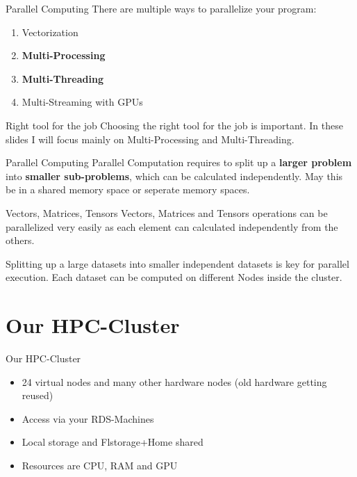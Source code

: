 \documentclass{beamer}
\begin{document}
\begin{frame}{Parallel Computing}
	There are multiple ways to parallelize your program:	
	\begin{enumerate}
		\item Vectorization
		\item \textbf{Multi-Processing}
		\item \textbf{Multi-Threading}
		\item Multi-Streaming with GPUs
	\end{enumerate}
	\begin{block}{Right tool for the job}
			Choosing the right tool for the job is important.  In these slides I will focus mainly on Multi-Processing and Multi-Threading.
	\end{block}

\end{frame}
\begin{frame}{Parallel Computing}
	Parallel Computation requires to split up a \textbf{larger problem} into \textbf{smaller sub-problems}, which can be calculated independently. May this be in a shared memory space or seperate memory spaces.
	
	\begin{block}{Vectors, Matrices, Tensors}
		Vectors, Matrices and Tensors operations can be parallelized very easily as each element can calculated independently from the others.
	\end{block}
	Splitting up a large datasets into smaller independent datasets is key for parallel execution. Each dataset can be computed on different Nodes inside the cluster.
\end{frame}

\section{Our HPC-Cluster}
\begin{frame}{Our HPC-Cluster}
	
	    \begin{itemize}
		\item 24 virtual nodes and many other hardware nodes (old hardware getting reused)
		\item Access via your RDS-Machines
		\item Local storage and Flstorage+Home shared
		\item Resources are CPU, RAM and GPU
	\end{itemize}

\end{frame}
\end{document}
